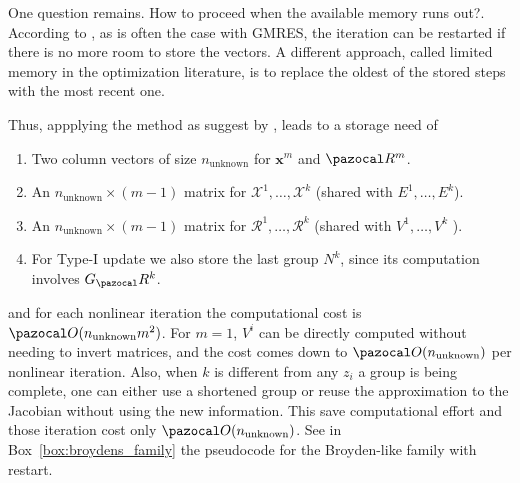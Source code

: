 One question remains. How to proceed when the available memory runs out?.
According to \cite{kelley_solving_2003}, as is often the case with GMRES, the iteration can be restarted if there is no more room to store the vectors.
A different approach, called limited memory in the optimization literature, is to replace the oldest of the stored steps with the most recent one.

Thus, appplying the method as suggest by \cite{fang_two_2009}, leads to a storage need of
\begin{enumerate}
  \item  Two column vectors of size \(n_\text{unknown}\) for \(\mathbf x^{m}\) and \(\pazocal R^{m}\).
  \item An \(n_\text{unknown} \times(m-1)\) matrix for \(\mathscr{X}^{1}, \ldots, \mathscr{X}^{k}\) (shared with \(E^{1}, \ldots, E^{k}\)).
  \item An \(n_\text{unknown} \times(m-1)\) matrix for \(\mathscr{R}^{1}, \ldots, \mathscr{R}^{k}\) (shared with \(V^{1}, \ldots, V^{k}\) ).
  \item For Type-I update we also store the last group \(N^{k}\), since its computation involves \(G_\pazocal R^{k}\).
\end{enumerate}
and for each nonlinear iteration the computational cost is \(\pazocal O(n_\text{unknown}m^2)\).
For \(m=1\), \(V^i\) can be directly computed without needing to invert matrices, and the cost comes down to \(\pazocal O(n_\text{unknown})\) per nonlinear iteration.
Also, when \(k\) is different from any \(z_i\) a group is being complete, one can either use a shortened group or reuse the approximation to the Jacobian without using the new information.
This save computational effort and those iteration cost only \(\pazocal O(n_\text{unknown})\).
See in Box~\ref{box:broydens_family} the pseudocode for the Broyden-like family with restart.

